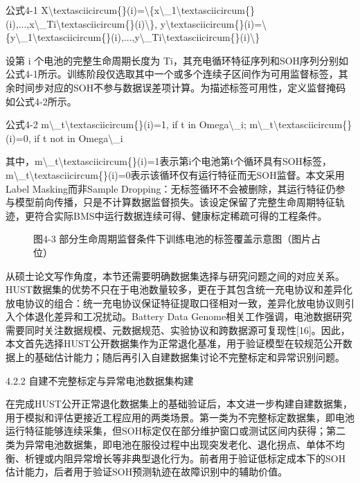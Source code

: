 \documentclass[12pt, a4paper]{ctexart}
\begin{document}
公式4-1  X\textbackslash{}textasciicircum\{\}(i)=\textbackslash{}\{x\textbackslash{}\_1\textbackslash{}textasciicircum\{\}(i),...,x\textbackslash{}\_Ti\textbackslash{}textasciicircum\{\}(i)\textbackslash{}\},  y\textbackslash{}textasciicircum\{\}(i)=\textbackslash{}\{y\textbackslash{}\_1\textbackslash{}textasciicircum\{\}(i),...,y\textbackslash{}\_Ti\textbackslash{}textasciicircum\{\}(i)\textbackslash{}\}


设第 i 个电池的完整生命周期长度为 Ti，其充电循环特征序列和SOH序列分别如公式4-1所示。训练阶段仅选取其中一个或多个连续子区间作为可用监督标签，其余时间步对应的SOH不参与数据误差项计算。为描述标签可用性，定义监督掩码如公式4-2所示。


公式4-2  m\textbackslash{}\_t\textbackslash{}textasciicircum\{\}(i)=1, if t in Omega\textbackslash{}\_i;  m\textbackslash{}\_t\textbackslash{}textasciicircum\{\}(i)=0, if t not in Omega\textbackslash{}\_i


其中，m\textbackslash{}\_t\textbackslash{}textasciicircum\{\}(i)=1表示第i个电池第t个循环具有SOH标签，m\textbackslash{}\_t\textbackslash{}textasciicircum\{\}(i)=0表示该循环仅有运行特征而无SOH监督。本文采用Label Masking而非Sample Dropping：无标签循环不会被删除，其运行特征仍参与模型前向传播，只是不计算数据监督损失。该设定保留了完整生命周期特征轨迹，更符合实际BMS中运行数据连续可得、健康标定稀疏可得的工程条件。



\begin{figure}[H]
  \centering
  \caption{图4-3  部分生命周期监督条件下训练电池的标签覆盖示意图（图片占位）}
  \label{fig:}
\end{figure}

从硕士论文写作角度，本节还需要明确数据集选择与研究问题之间的对应关系。HUST数据集的优势不只在于电池数量较多，更在于其包含统一充电协议和差异化放电协议的组合：统一充电协议保证特征提取口径相对一致，差异化放电协议则引入个体退化差异和工况扰动。Battery Data Genome相关工作强调，电池数据研究需要同时关注数据规模、元数据规范、实验协议和跨数据源可复现性[16]。因此，本文首先选择HUST公开数据集作为正常退化基准，用于验证模型在较规范公开数据上的基础估计能力；随后再引入自建数据集讨论不完整标定和异常识别问题。


4.2.2 自建不完整标定与异常电池数据集构建


在完成HUST公开正常退化数据集上的基础验证后，本文进一步构建自建数据集，用于模拟和评估更接近工程应用的两类场景。第一类为不完整标定数据集，即电池运行特征能够连续采集，但SOH标定仅在部分维护窗口或测试区间内获得；第二类为异常电池数据集，即电池在服役过程中出现突发老化、退化拐点、单体不均衡、析锂或内阻异常增长等非典型退化行为。前者用于验证低标定成本下的SOH估计能力，后者用于验证SOH预测轨迹在故障识别中的辅助价值。
\end{document}
